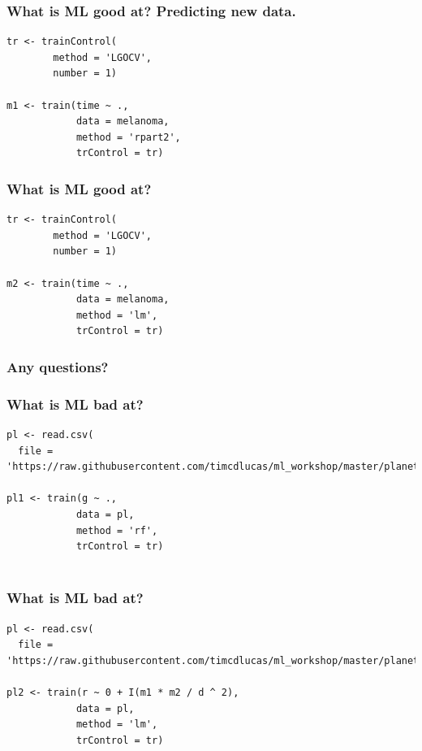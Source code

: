 \documentclass[handout, aspectratio = 169]{beamer}
\begin{document}
\begin{frame}[fragile]
\frametitle{What is ML good at? Predicting new data.}
\renewcommand{\FancyVerbFormatLine}[1]{%
   \ifnum\value{FancyVerbLine}=8\color{cyan}#1%
   \else #1\fi}
\begin{Verbatim}
tr <- trainControl(
        method = 'LGOCV',
        number = 1)

m1 <- train(time ~ ., 
            data = melanoma,
            method = 'rpart2',
            trControl = tr)

\end{Verbatim}

\end{frame} 






\begin{frame}[fragile]
\frametitle{What is ML good at?}
\renewcommand{\FancyVerbFormatLine}[1]{%
   \ifnum\value{FancyVerbLine}=7\color{cyan}#1%
   \else #1\fi}
\begin{Verbatim}
tr <- trainControl(
        method = 'LGOCV',
        number = 1)

m2 <- train(time ~ ., 
            data = melanoma,
            method = 'lm',
            trControl = tr)

\end{Verbatim}

\end{frame} 



\begin{frame}
\frametitle{Any questions?}


\end{frame} 




\begin{frame}[fragile]
\frametitle{What is ML bad at?}
\renewcommand{\FancyVerbFormatLine}[1]{%
   \ifnum\value{FancyVerbLine}=1\color{cyan}#1%
   \else #1\fi}
\begin{Verbatim}
pl <- read.csv(
  file = 'https://raw.githubusercontent.com/timcdlucas/ml_workshop/master/planets.csv')

pl1 <- train(g ~ ., 
            data = pl,
            method = 'rf',
            trControl = tr)


\end{Verbatim}

\end{frame} 


\begin{frame}[fragile]
\frametitle{What is ML bad at?}
\renewcommand{\FancyVerbFormatLine}[1]{%
   \ifnum\value{FancyVerbLine}=1\color{cyan}#1%
   \else #1\fi}
\begin{Verbatim}
pl <- read.csv(
  file = 'https://raw.githubusercontent.com/timcdlucas/ml_workshop/master/planets.csv')

pl2 <- train(r ~ 0 + I(m1 * m2 / d ^ 2), 
            data = pl,
            method = 'lm',
            trControl = tr)

\end{Verbatim}

\end{frame} 
\end{document}
